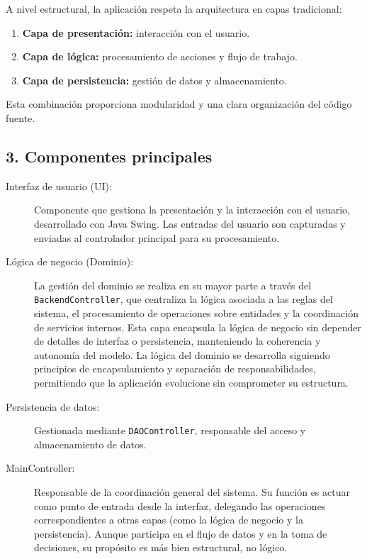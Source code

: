 A nivel estructural, la aplicación respeta la arquitectura en capas tradicional:

\begin{enumerate}
    \item \textbf{Capa de presentación:} interacción con el usuario.
    \item \textbf{Capa de lógica:} procesamiento de acciones y flujo de trabajo.
    \item \textbf{Capa de persistencia:} gestión de datos y almacenamiento.
\end{enumerate}

Esta combinación proporciona modularidad y una clara organización del código fuente.

\newpage

\begin{samepage}
    
\end{samepage}
\subsection*{3. Componentes principales}

\begin{description}
    \item[Interfaz de usuario (UI):] Componente que gestiona la presentación y la interacción con el usuario, desarrollado con Java Swing.
    Las entradas del usuario son capturadas y enviadas al controlador principal para su procesamiento.
    \item[Lógica de negocio (Dominio):] La gestión del dominio se realiza en su mayor parte a través del \texttt{BackendController}, que centraliza la lógica asociada a las reglas del sistema, 
    el procesamiento de operaciones sobre entidades y la coordinación de servicios internos. 
    Esta capa encapsula la lógica de negocio sin depender de detalles de interfaz o persistencia, manteniendo la coherencia y autonomía del modelo. 
    La lógica del dominio se desarrolla siguiendo principios de encapsulamiento y separación de responsabilidades, permitiendo que la aplicación evolucione sin comprometer su estructura.
    \item[Persistencia de datos:] Gestionada mediante \texttt{DAOController}, responsable del acceso y almacenamiento de datos.
    \item[MainController:] Responsable de la coordinación general del sistema. Su función es actuar como punto de entrada desde la interfaz,
    delegando las operaciones correspondientes a otras capas (como la lógica de negocio y la persistencia). Aunque participa en el flujo de datos y en la toma de decisiones,
    su propósito es más bien estructural, no lógico.
\end{description}

